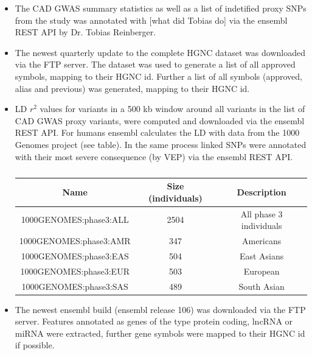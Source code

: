 \begin{itemize}
    \item {} The CAD GWAS summary statistics as well as a list of indetified proxy SNPs from the study was annotated with [what did Tobias do] via the ensembl REST API by Dr. Tobias Reinberger.
    \item {} The newest quarterly update to the complete HGNC dataset was downloaded via the FTP server. The dataset was used to generate a list of all approved symbols, mapping to their HGNC id. Further a list of all symbols (approved, alias and previous) was generated, mapping to their HGNC id.
    \item {} LD $r^2$ values for variants in a 500 kb window around all variants in the list of CAD GWAS proxy variants, were computed and downloaded via the ensembl REST API. For humans ensembl calculates the LD with data from the 1000 Genomes project (see table). In the same process linked SNPs were annotated with their most severe consequence (by VEP) via the ensembl REST API.
    \begin{table}[h]
    \capstart
    \centering
    \begin{minipage}{\captionwidth}
        \caption[1000 Genomes Populations]{}
        \label{tab:populations}
    \end{minipage}
    \begin{tabular}{|c|c|c|}
        \hline
        Name                   & Size (individuals)   & Description      \\ \hline
        1000GENOMES:phase3:ALL & 2504                 & All phase 3 individuals  \\
        1000GENOMES:phase3:AMR & 347                  & Americans  \\
        1000GENOMES:phase3:EAS & 504                  & East Asians  \\
        1000GENOMES:phase3:EUR & 503                  & European \\
        1000GENOMES:phase3:SAS & 489                  & South Asian  \\ \hline
    \end{tabular}
    \end{table}
    \item {} The newest ensembl build (ensembl release 106) was downloaded via the FTP server. Features annotated as genes of the type protein coding, lncRNA or miRNA were extracted, further gene symbols were mapped to their HGNC id if possible.

\end{itemize}
